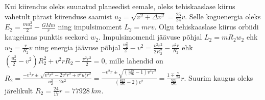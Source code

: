 Kui kiirendus oleks suunatud planeedist eemale, oleks tehiskaaslase kiirus vahetult pärast kiirenduse saamist $u_2=\sqrt{v^2+\Delta v^2}=\frac{25}{24}v$. Selle koguenergia oleks $E_2=\frac{mu_2^2}{2}-\frac{GMm}{r}$ ning impulsimoment $L_2=mrv$. Olgu tehiskaaslase kiirus orbiidi kaugeimas punktis seekord $w_2$. Impulsimomendi jäävuse põhjal $L_2=mR_2w_2$ ehk $w_2=\frac{r}{R_2}v$ ning energia jäävuse põhjal $\frac{u_2^2}{2}-v^2=\frac{v^2r^2}{2R_2^2}-\frac{v^2r}{R_2}$ ehk $\left(\frac{u_2^2}{2}-v^2\right)R_2^2+v^2rR_2-\frac{v^2r^2}{2}=0$, mille lahendid on $R_2=\frac{-v^2r\pm\sqrt{v^4r^2-2v^4r^2+v^2u_2^2r^2}}{u_2^2-2v^2}=\frac{-v^2r\pm\sqrt{\left(\frac{625}{576}-1\right)v^4r^2}}{\left(\frac{625}{576}-2\right)v^2}=\frac{1\mp\frac{7}{24}}{\frac{527}{576}}r$. Suurim kaugus oleks järelikult $R_2=\frac{24}{17}r=\SI{77928}{km}$.
\probend